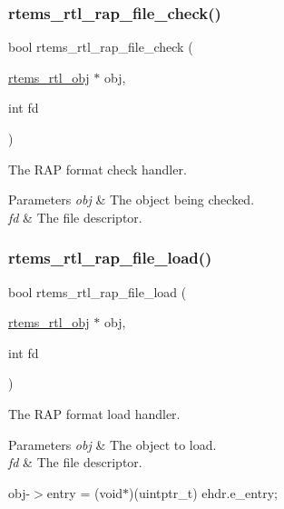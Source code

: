 \subsubsection{\texorpdfstring{rtems\_rtl\_rap\_file\_check()}{rtems\_rtl\_rap\_file\_check()}}
{\footnotesize\ttfamily bool rtems\+\_\+rtl\+\_\+rap\+\_\+file\+\_\+check (\begin{DoxyParamCaption}\item[{\mbox{\hyperlink{structrtems__rtl__obj}{rtems\+\_\+rtl\+\_\+obj}} $\ast$}]{obj,  }\item[{int}]{fd }\end{DoxyParamCaption})}

The R\+AP format check handler.


\begin{DoxyParams}{Parameters}
{\em obj} & The object being checked. \\
\hline
{\em fd} & The file descriptor. \\
\hline
\end{DoxyParams}
\mbox{\label{rtl-rap_8h_a0ce5487461c31a98e4ddda966ad7fad9}} 
\subsubsection{\texorpdfstring{rtems\_rtl\_rap\_file\_load()}{rtems\_rtl\_rap\_file\_load()}}
{\footnotesize\ttfamily bool rtems\+\_\+rtl\+\_\+rap\+\_\+file\+\_\+load (\begin{DoxyParamCaption}\item[{\mbox{\hyperlink{structrtems__rtl__obj}{rtems\+\_\+rtl\+\_\+obj}} $\ast$}]{obj,  }\item[{int}]{fd }\end{DoxyParamCaption})}

The R\+AP format load handler.


\begin{DoxyParams}{Parameters}
{\em obj} & The object to load. \\
\hline
{\em fd} & The file descriptor. \\
\hline
\end{DoxyParams}
obj-\/$>$entry = (void$\ast$)(uintptr\+\_\+t) ehdr.\+e\+\_\+entry; \mbox{\label{rtl-rap_8h_a0ba92ca2206cf08da6e0ead2563ae1fd}} 
